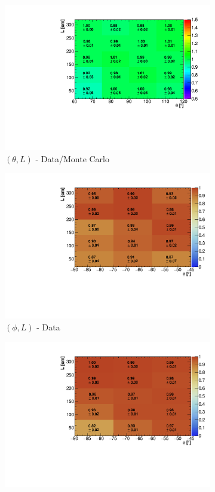 \documentclass[a4paper,11pt]{article}
\begin{document}
\begin{figure}[htbp]
\begin{subfigure}{0.32\textwidth}
\includegraphics[width=\linewidth]{figures/theta_l.pdf}
\caption{$(\theta,L)$ - Data/Monte Carlo}
\end{subfigure}
\begin{subfigure}{0.32\textwidth}
  \includegraphics[width=\linewidth]{figures/e_phi_l.pdf}
  \caption{$(\phi,L)$ - Data}
\end{subfigure}\begin{subfigure}{0.32\textwidth}
\includegraphics[width=\linewidth]{figures/phi_l_mc.pdf}

\end{subfigure}
\end{figure}
\end{document}

